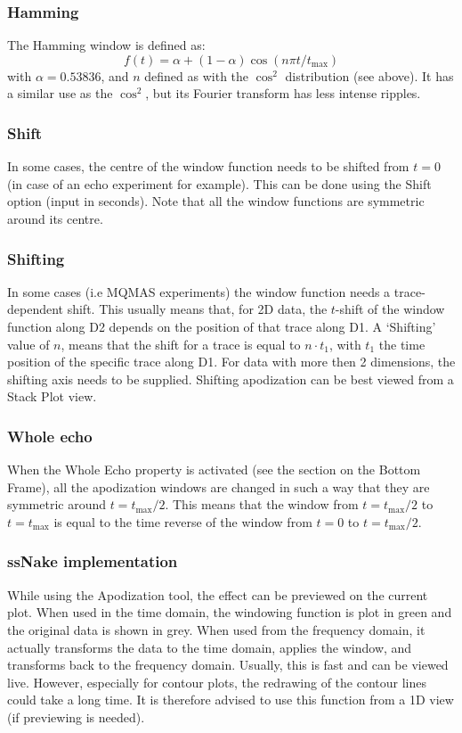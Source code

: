 \documentclass[11pt,a4paper]{article}
\begin{document}
\subsubsection{Hamming}
The Hamming window is defined as:
\begin{equation}
  f(t) = \alpha + (1 - \alpha)\cos(n\pi t/t_\text{max})
\end{equation}
with $\alpha = 0.53836$, and $n$ defined as with the $\cos^2$ distribution (see above). It has a similar use as the $\cos^2$, but its Fourier transform has less intense ripples.

\subsubsection{Shift}
In some cases, the centre of the window function needs to be shifted from $t = 0$ (in case of an echo experiment for example). This can be done using the Shift option (input in seconds). Note that all the window functions are symmetric around its centre.

\subsubsection{Shifting}
In some cases (i.e MQMAS experiments) the window function needs a trace-dependent shift. This usually means that, for 2D data, the $t$-shift of the window function along D2 depends on the position of that trace along D1. A `Shifting' value of $n$, means that the shift for a trace is equal to $n \cdot t_1$, with $t_1$ the time position of the specific trace along D1.
For data with more then 2 dimensions, the shifting axis needs to be supplied.
Shifting apodization can be best viewed from a Stack Plot view.

\subsubsection{Whole echo}
When the Whole Echo property is activated (see the section on the Bottom Frame), all the apodization windows are changed in such a way that they are symmetric around $t = t_\text{max}/2$. This means that the window from $t=t_\text{max}/2$ to $t=t_\text{max}$ is equal to the time reverse of the window from $t=0$ to $t=t_\text{max}/2$.

\subsubsection{ssNake implementation}
While using the Apodization tool, the effect can be previewed on the current plot. When used in the
time domain, the windowing function is plot in green and the original data is shown in grey. When
used from the frequency domain, it actually transforms the data to the time domain, applies the
window, and transforms back to the frequency domain. Usually, this is fast and can be viewed live.
However, especially for contour plots, the redrawing of the contour lines could take a long time. It
is therefore advised to use this function from a 1D view (if previewing is needed).
\end{document}
